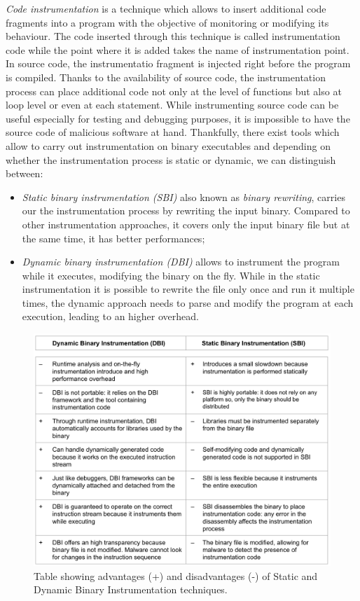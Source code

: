\documentclass[LaM,binding=0.6cm]{sapthesis}
\begin{document}
\textit{Code instrumentation} is a technique which allows to insert additional code fragments into a program with the objective of monitoring or modifying its behaviour. The code inserted through this technique is called instrumentation code while the point where it is added takes the name of instrumentation point.\\
In source code, the instrumentatio fragment is injected right before the program is compiled\cite{geimer2009generic}. Thanks to the availability of source code, the instrumentation process can place additional code not only at the level of functions but also at loop level or even at each statement. While instrumenting source code can be useful especially for testing and debugging purposes, it is impossible to have the source code of malicious software at hand. Thankfully, there exist tools which allow to carry out instrumentation on binary executables and depending on whether the instrumentation process is static or dynamic, we can distinguish between:
\begin{itemize}
\item \textit{Static binary instrumentation (SBI)} also known as \textit{binary rewriting}, carries our the instrumentation process by rewriting the input binary. Compared to other instrumentation approaches, it covers only the input binary file but at the same time, it has better performances\cite{ermakov2017static};
\item \textit{Dynamic binary instrumentation (DBI)} allows to instrument the program while it executes, modifying the binary on the fly. While in the static instrumentation it is possible to rewrite the file only once and run it multiple times, the dynamic approach needs to parse and modify the program at each execution, leading to an higher overhead.
\end{itemize}

\begin{figure}[h!]
\centering
\includegraphics[scale=.5]{images/techn6}
\caption{Table showing advantages (+) and disadvantages (-) of Static and Dynamic Binary Instrumentation techniques.}
\end{figure}
\newpage
\end{document}
